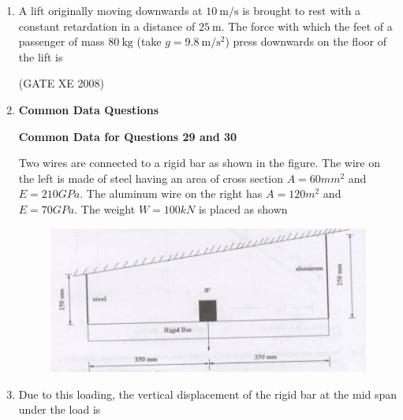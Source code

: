\documentclass[12pt]{article}
\begin{document}
\begin{enumerate}
    \item A lift originally moving downwards at $10\ \mathrm{m/s}$ is brought to rest with a constant retardation in a distance of $25\ \mathrm{m}$. The force with which the feet of a passenger of mass $80\ \mathrm{kg}$ (take $g = 9.8\ \mathrm{m/s^2}$) press downwards on the floor of the lift is 

\begin{enumerate}
\end{enumerate}
    
    (GATE XE 2008)  

\item[] \textbf{\Large Common Data Questions}

\textbf{Common Data for Questions 29 and 30}

Two wires are connected to a rigid bar as shown in the figure. The wire on the left is made of steel having an area of cross section $A = 60 mm^2$ and $E = 210 GPa$. The aluminum wire on the right has $A = 120 m^2$ and $E = 70 GPa$. The weight $W = 100 kN$ is placed as shown

    \begin{figure}[H]
    \centering
    \includegraphics[width=0.7\columnwidth]{figs/ass1_f_q29.png}
    \caption{}
    \end{figure}


\item Due to this loading, the vertical displacement of the rigid bar at the mid span under the load is  

\begin{enumerate}
\end{enumerate}


\end{enumerate}
\end{document}
